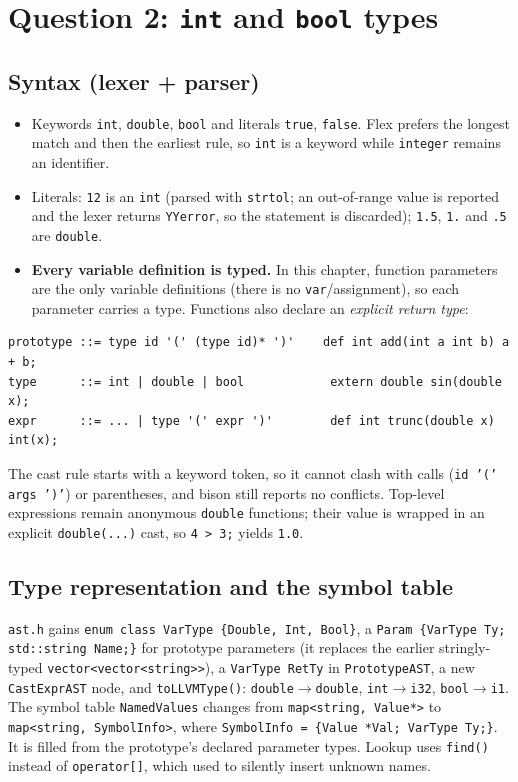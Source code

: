 \documentclass[10pt,a4paper]{article}
\newcommand{\code}[1]{\texttt{#1}}
\begin{document}
\section{Question 2: \code{int} and \code{bool} types}
\subsection{Syntax (lexer + parser)}
\begin{itemize}
\item Keywords \code{int}, \code{double}, \code{bool} and literals \code{true},
  \code{false}. Flex prefers the longest match and then the earliest rule, so
  \code{int} is a keyword while \code{integer} remains an identifier.
\item Literals: \code{12} is an \code{int} (parsed with \code{strtol}; an
  out-of-range value is reported and the lexer returns \code{YYerror}, so the
  statement is discarded); \code{1.5}, \code{1.} and \code{.5} are \code{double}.
\item \textbf{Every variable definition is typed.} In this chapter, function
  parameters are the only variable definitions (there is no \code{var}/assignment),
  so each parameter carries a type. Functions also declare an \emph{explicit
  return type}:
\end{itemize}
\begin{lstlisting}
prototype ::= type id '(' (type id)* ')'    def int add(int a int b) a + b;
type      ::= int | double | bool            extern double sin(double x);
expr      ::= ... | type '(' expr ')'        def int trunc(double x) int(x);
\end{lstlisting}
The cast rule starts with a keyword token, so it cannot clash with calls
(\code{id '(' args ')'}) or parentheses, and bison still reports no conflicts.
Top-level expressions remain anonymous \code{double} functions; their value is
wrapped in an explicit \code{double(...)} cast, so \code{4 > 3;} yields \code{1.0}.

\subsection{Type representation and the symbol table}
\code{ast.h} gains \code{enum class VarType \{Double, Int, Bool\}}, a
\code{Param \{VarType Ty; std::string Name;\}} for prototype parameters (it
replaces the earlier stringly-typed \code{vector<vector<string>>}), a
\code{VarType RetTy} in \code{PrototypeAST}, a new \code{CastExprAST} node, and
\code{toLLVMType()}: \code{double}$\to$\code{double}, \code{int}$\to$\code{i32},
\code{bool}$\to$\code{i1}. The symbol table \code{NamedValues} changes from
\code{map<string, Value*>} to \code{map<string, SymbolInfo>}, where
\code{SymbolInfo = \{Value *Val; VarType Ty;\}}. It is filled from the
prototype's declared parameter types. Lookup uses \code{find()} instead of
\code{operator[]}, which used to silently insert unknown names.
\end{document}
